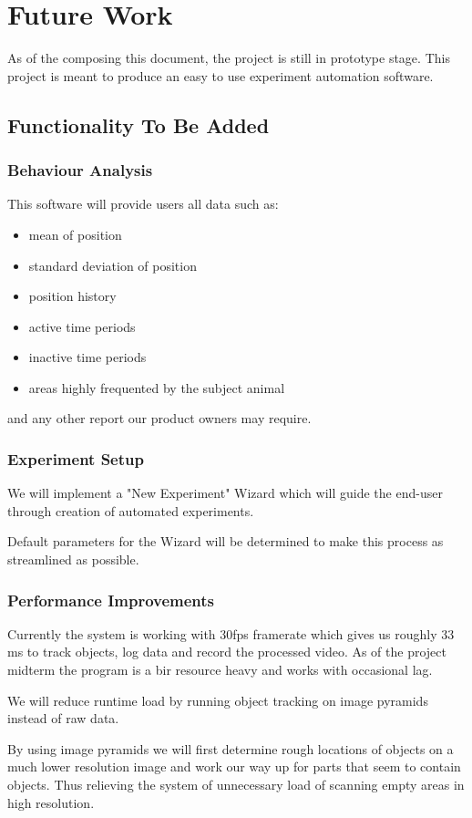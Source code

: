 \chapter{Future Work}
As of the composing this document, the project is still in prototype stage. This project is meant to produce an easy to use experiment automation software. 
\section{Functionality To Be Added}

\subsection{Behaviour Analysis}

This software will provide users all data such as: 
\begin{itemize}
\item mean of position
\item standard deviation of position
\item position history
\item active time periods
\item inactive time periods
\item areas highly frequented by the subject animal
\end{itemize}
and any other report our product owners may require.

\subsection{Experiment Setup}
We will implement a "New Experiment" Wizard which will guide the end-user through creation of automated experiments. 

Default parameters for the Wizard will be determined to make this process as streamlined as possible.

\subsection{Performance Improvements}
Currently the system is working with 30fps framerate which gives us roughly 33 ms to track objects, log data and record the processed video. As of the project midterm the program is a bir resource heavy and works with occasional lag. 

We will reduce runtime load by running object tracking on image pyramids instead of raw data.

By using image pyramids we will first determine rough locations of objects on a much lower resolution image and work our way up for parts that seem to contain objects. Thus relieving the system of unnecessary load of scanning empty areas in high resolution.

